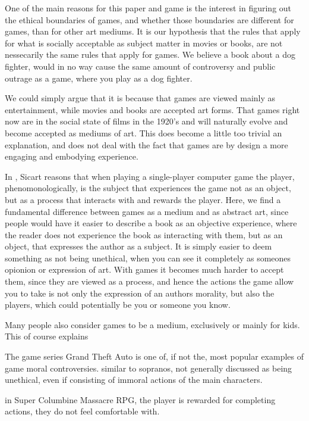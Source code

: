 One of the main reasons for this paper and game is the interest in figuring out the ethical boundaries of games, and whether those boundaries are different for games, than for other art mediums. It is our hypothesis that the rules that apply for what is socially acceptable as subject matter in movies or books, are not nessecarily the same rules that apply for games. We believe a book about a dog fighter, would in no way cause the same amount of controversy and public outrage as a game, where you play as a dog fighter. \

We could simply argue that it is because that games are viewed mainly as entertainment, while movies and books are accepted art forms. That games right now are in the social state of films in the 1920's and will naturally evolve and become accepted as mediums of art. This does become a little too trivial an explanation, and does not deal with the fact that games are by design a more engaging and embodying experience.\

In \citep{sicart2011ethics}, Sicart reasons that when playing a single-player computer game the player, phenomonologically, is the subject that experiences the game not as an object, but as a process that interacts with and rewards the player. Here, we find a fundamental difference between games as a medium and as abstract art, since people would have it easier to describe a book as an objective experience, where the reader does not experience the book as interacting with them, but as an object, that expresses the author as a subject. It is simply easier to deem something as not being unethical, when you can see it completely as someones opionion or expression of art. With games it becomes much harder to accept them, since they are viewed as a process, and hence the actions the game allow you to take is not only the expression of an authors morality, but also the players, which could potentially be you or someone you know. \

Many people also consider games to be a medium, exclusively or mainly for kids. This of course explains 

The game series Grand Theft Auto\cite{north2013grand} is one of, if not the, most popular examples of game moral controversies. 
similar to sopranos, not generally discussed as being unethical, even if consisting of immoral actions of the main characters.
\


in Super Columbine Massacre RPG\cite{ledone2005super}, the player is rewarded for completing actions, they do not feel comfortable with. 

